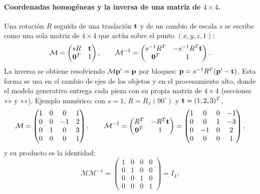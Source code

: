 \paragraph{Coordenadas homogéneas y la inversa de una matriz de $4\times4$.} Una rotación $R$ seguida de una
traslación $\mathbf{t}$ y de un cambio de escala $s$ se escribe como una sola matriz de $4\times4$
que actúa sobre el punto $(x,y,z,1)$:
\begin{equation}
\mathcal{M}=\begin{pmatrix}sR&\mathbf{t}\\\mathbf{0}^{T}&1\end{pmatrix},\qquad
\mathcal{M}^{-1}=\begin{pmatrix}s^{-1}R^{T}&-s^{-1}R^{T}\mathbf{t}\\\mathbf{0}^{T}&1\end{pmatrix}.
\end{equation}
La inversa se obtiene resolviendo $\mathcal{M}\mathbf{p}'=\mathbf{p}$ por bloques: $\mathbf{p}=s^{-1}R^{T}(\mathbf{p}'-\mathbf{t})$.
Esta forma se usa en el cambio de ejes de los objetos y en el procesamiento alto, donde el modelo generativo entrega cada pieza con su
propia matriz de $4\times4$ (secciones «» y «»).
Ejemplo numérico: con $s=1$, $R=R_x(90^\circ)$ y $\mathbf{t}=(1,2,3)^{T}$,
\begin{equation}
\mathcal{M}=\begin{pmatrix} 1 & 0 & 0 & 1 \\ 0 & 0 & -1 & 2 \\ 0 & 1 & 0 & 3 \\ 0 & 0 & 0 & 1 \end{pmatrix},\qquad
\mathcal{M}^{-1}=\begin{pmatrix}R^{T}&-R^{T}\mathbf{t}\\\mathbf{0}^{T}&1\end{pmatrix}=\begin{pmatrix} 1 & 0 & 0 & -1 \\ 0 & 0 & 1 & -3 \\ 0 & -1 & 0 & 2 \\ 0 & 0 & 0 & 1 \end{pmatrix},
\end{equation}
y su producto es la identidad:
\begin{equation}
\mathcal{M}\mathcal{M}^{-1}=\begin{pmatrix} 1 & 0 & 0 & 0 \\ 0 & 1 & 0 & 0 \\ 0 & 0 & 1 & 0 \\ 0 & 0 & 0 & 1 \end{pmatrix}=I_4 ,
\end{equation}

